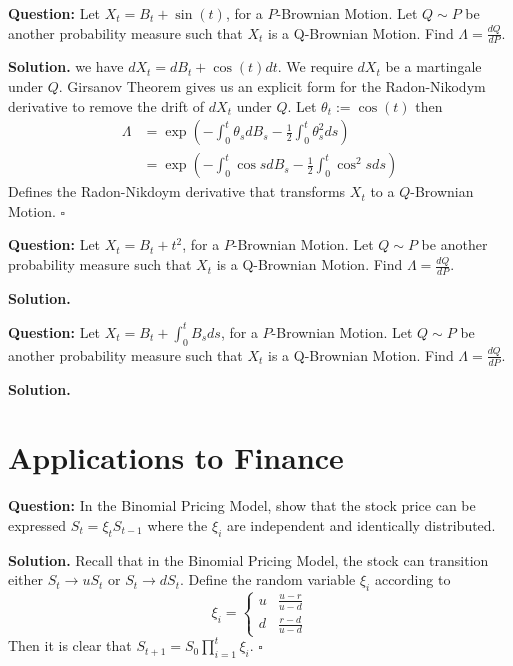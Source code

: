 \documentclass{article}
\begin{document}
\begin{tcolorbox}[colframe=black,colback=gray!5,boxrule=0.5pt]
\textbf{Question:} Let $X_t = B_t + \sin(t)$, for a $P$-Brownian Motion. Let $Q\sim P$ be another probability measure such that $X_t$ is a Q-Brownian Motion. Find $\Lambda = \frac{dQ}{dP}$.
\end{tcolorbox}
\textbf{Solution.} we have $dX_t = dB_t + \cos(t)dt$. We require $dX_t$ be a martingale under $Q$. Girsanov Theorem gives us an explicit form for the Radon-Nikodym derivative to remove the drift of $dX_t$ under $Q$. Let $\theta _t := \cos(t)$ then 
\begin{align*}
    \Lambda &= \exp\left(-\int_0^t\theta_sdB_s - \frac{1}{2}\int_0^t\theta_s^2ds\right) \\
    &= \exp\left(-\int_0^t \cos sdB_s - \frac{1}{2}\int_0^t\cos^2s ds\right)
\end{align*}
Defines the Radon-Nikdoym derivative that transforms $X_t$ to a $Q$-Brownian Motion. $\square$

\begin{tcolorbox}[colframe=black,colback=gray!5,boxrule=0.5pt]
\textbf{Question:} Let $X_t = B_t + t^2$, for a $P$-Brownian Motion. Let $Q\sim P$ be another probability measure such that $X_t$ is a Q-Brownian Motion. Find $\Lambda = \frac{dQ}{dP}$.
\end{tcolorbox}
\textbf{Solution.}

\begin{tcolorbox}[colframe=black,colback=gray!5,boxrule=0.5pt]
\textbf{Question:} Let $X_t = B_t + \int_0^t B_sds$, for a $P$-Brownian Motion. Let $Q\sim P$ be another probability measure such that $X_t$ is a Q-Brownian Motion. Find $\Lambda = \frac{dQ}{dP}$.
\end{tcolorbox}
\textbf{Solution.}




\newpage
\section{Applications to Finance}

\begin{tcolorbox}[colframe=black,colback=gray!5,boxrule=0.5pt]
\textbf{Question:} In the Binomial Pricing Model, show that the stock price can be expressed $S_t = \xi_tS_{t-1}$ where the $\xi_i$ are independent and identically distributed.   \cite{Fima}
\end{tcolorbox}
\textbf{Solution.}
Recall that in the Binomial Pricing Model, the stock can transition either $S_{t} \to uS_t$ or $S_t \to dS_t$. Define the random variable $\xi_i$ according to 
\[ \xi_i = \begin{cases} 
      u & \frac{u-r}{u-d} \\
      d & \frac{r-d}{u-d}
   \end{cases}
\]
Then it is clear that $S_{t+1} = S_0\prod_{i=1}^{t}\xi_i$. $\square$
\end{document}
